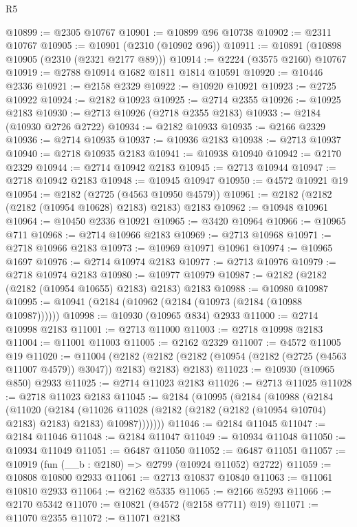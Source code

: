 \begin{lexlean}{R5}
\begin{coremodule}
@10899 := @2305 @10767
@10901 := @10899 @96 @10738
@10902 := @2311 @10767
@10905 := @10901 (@2310 (@10902 @96))
@10911 := @10891 (@10898 @10905 (@2310 (@2321 @2177 @89)))
@10914 := @2224 (@3575 @2160) @10767
@10919 := @2788 @10914 @1682 @1811 @1814 @10591
@10920 := @10446 @2336
@10921 := @2158 @2329
@10922 := @10920 @10921
@10923 := @2725 @10922
@10924 := @2182 @10923
@10925 := @2714 @2355
@10926 := @10925 @2183
@10930 := @2713 @10926 (@2718 @2355 @2183)
@10933 := @2184 (@10930 @2726 @2722)
@10934 := @2182 @10933
@10935 := @2166 @2329
@10936 := @2714 @10935
@10937 := @10936 @2183
@10938 := @2713 @10937
@10940 := @2718 @10935 @2183
@10941 := @10938 @10940
@10942 := @2170 @2329
@10944 := @2714 @10942 @2183
@10945 := @2713 @10944
@10947 := @2718 @10942 @2183
@10948 := @10945 @10947
@10950 := @4572 @10921 @19
@10954 := @2182 (@2725 (@4563 @10950 @4579))
@10961 := @2182 (@2182 (@2182 (@10954 @10628) @2183) @2183) @2183
@10962 := @10948 @10961
@10964 := @10450 @2336 @10921
@10965 := @3420 @10964
@10966 := @10965 @711
@10968 := @2714 @10966 @2183
@10969 := @2713 @10968
@10971 := @2718 @10966 @2183
@10973 := @10969 @10971 @10961
@10974 := @10965 @1697
@10976 := @2714 @10974 @2183
@10977 := @2713 @10976
@10979 := @2718 @10974 @2183
@10980 := @10977 @10979
@10987 := @2182 (@2182 (@2182 (@10954 @10655) @2183) @2183) @2183
@10988 := @10980 @10987
@10995 := @10941 (@2184 (@10962 (@2184 (@10973 (@2184 (@10988 @10987))))))
@10998 := @10930 (@10965 @834) @2933
@11000 := @2714 @10998 @2183
@11001 := @2713 @11000
@11003 := @2718 @10998 @2183
@11004 := @11001 @11003
@11005 := @2162 @2329
@11007 := @4572 @11005 @19
@11020 := @11004
    (@2182 (@2182 (@2182 (@10954 (@2182 (@2725 (@4563 @11007 @4579)) @3047)) @2183) @2183) @2183)
@11023 := @10930 (@10965 @850) @2933
@11025 := @2714 @11023 @2183
@11026 := @2713 @11025
@11028 := @2718 @11023 @2183
@11045 := @2184
    (@10995
      (@2184
        (@10988
          (@2184
            (@11020
              (@2184
                (@11026
                  @11028
                  (@2182 (@2182 (@2182 (@10954 @10704) @2183) @2183) @2183)
                  @10987)))))))
@11046 := @2184 @11045
@11047 := @2184 @11046
@11048 := @2184 @11047
@11049 := @10934 @11048
@11050 := @10934 @11049
@11051 := @6487 @11050
@11052 := @6487 @11051
@11057 := @10919 (fun (__b : @2180) => @2799 (@10924 @11052) @2722)
@11059 := @10808 @10800 @2933
@11061 := @2713 @10837 @10840
@11063 := @11061 @10810 @2933
@11064 := @2162 @5335
@11065 := @2166 @5293
@11066 := @2170 @5342
@11070 := @10821 (@4572 (@2158 @7711) @19)
@11071 := @11070 @2355
@11072 := @11071 @2183

\end{coremodule}
\end{lexlean}
